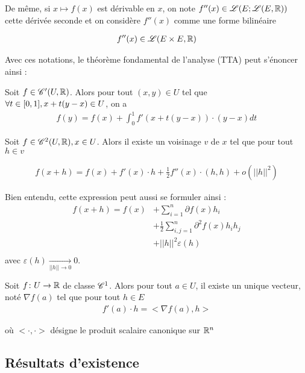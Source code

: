 \documentclass[french,a4paper,10pt]{article}
\begin{document}
	De même, si $x\mapsto f(x)$ est dérivable en $x$, on note $f''(x)\in\mathscr{L}(E;\mathscr{L}(E, \mathbb{R}))$ cette dérivée seconde et on considère $f''(x)$ comme une forme bilinéaire 
	
		\[\begin{aligned}
			f''(x)\in\mathscr{L}(E\times E,\mathbb{R})
		\end{aligned}\]
	
	Avec ces notations, le théorème fondamental de l'analyse (TTA) peut s'énoncer ainsi :
	
	\begin{oc-theorem}
		Soit $f\in\mathscr{C}'(U, \mathbb{R})$. Alors pour tout $(x, y)\in U$ tel que $\forall t\in\mathopen{[}0, 1\mathclose{]}, x+t(y-x)\in U$, on a
			\[\begin{aligned}
				f(y)=f(x) + \int_0^1f'(x+t(y-x))\cdot(y-x)dt
			\end{aligned}\]	
	\end{oc-theorem}

	
	Soit $f\in \mathscr{C}^2(U, \mathbb{R}), x\in U$. Alors il existe un voisinage $v$ de $x$ tel que pour tout $h\in v$
	
		\[\begin{aligned}
			f(x+h)=f(x)+f'(x)\cdot h+\frac12 f''(x)\cdot(h,h)+ o(||h||^2)
		\end{aligned}\]
	
	Bien entendu, cette expression peut aussi se formuler ainsi :
		\[\begin{aligned}
			f(x+h)=f(x)&+\sum_{i=1}^n\partial f(x)h_i\\&+\frac12\sum_{i,j=1}^n\partial^2f(x)h_ih_j\\&+||h||^2\varepsilon (h)\\
		\end{aligned}\]
	avec $\varepsilon(h)\underset{||h||\to 0}\to 0$.
	
	
	Soit $f\colon U\to \mathbb{R}$ de classe $\mathscr{C}^1$. Alors pour tout $a\in U$, il existe un unique vecteur, noté $\nabla f(a)$ tel que pour tout $h\in E$
		\[\begin{aligned}
			f'(a)\cdot h=<\nabla f(a), h>
		\end{aligned}\]
	
	où $<\cdot, \cdot>$ désigne le produit scalaire canonique sur $\mathbb{R}^n$
	
	\subsection{Résultats d'existence}
	
\end{document}

